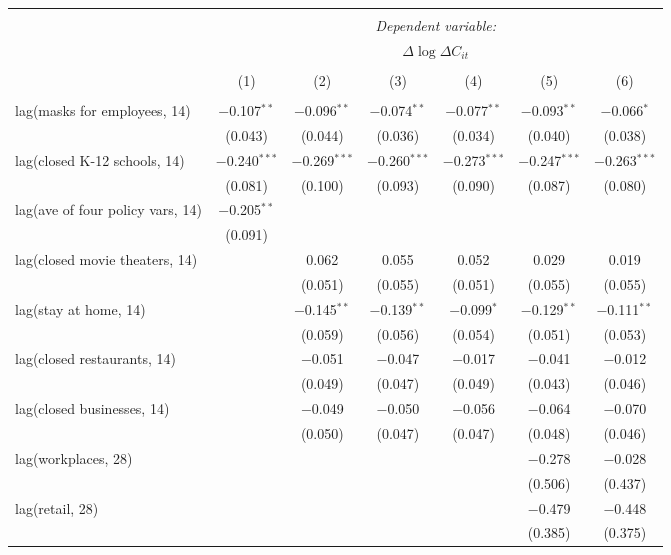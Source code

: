 \begin{tabular}{@{\extracolsep{1pt}}lcccccc} 
\\[-1.8ex]\hline 
\hline \\[-1.8ex] 
 & \multicolumn{6}{c}{\textit{Dependent variable:}} \\ 
\cline{2-7} 
 & \multicolumn{6}{c}{$\Delta \log \Delta C_{it}$} \\ 
\\[-1.8ex] & (1) & (2) & (3) & (4) & (5) & (6)\\ 
\hline \\[-1.8ex] 
 lag(masks for employees, 14) & $-$0.107$^{**}$ & $-$0.096$^{**}$ & $-$0.074$^{**}$ & $-$0.077$^{**}$ & $-$0.093$^{**}$ & $-$0.066$^{*}$ \\ 
  & (0.043) & (0.044) & (0.036) & (0.034) & (0.040) & (0.038) \\ 
  lag(closed K-12 schools, 14) & $-$0.240$^{***}$ & $-$0.269$^{***}$ & $-$0.260$^{***}$ & $-$0.273$^{***}$ & $-$0.247$^{***}$ & $-$0.263$^{***}$ \\ 
  & (0.081) & (0.100) & (0.093) & (0.090) & (0.087) & (0.080) \\ 
  lag(ave of four policy vars, 14) & $-$0.205$^{**}$ &  &  &  &  &  \\ 
  & (0.091) &  &  &  &  &  \\ 
  lag(closed movie theaters, 14) &  & 0.062 & 0.055 & 0.052 & 0.029 & 0.019 \\ 
  &  & (0.051) & (0.055) & (0.051) & (0.055) & (0.055) \\ 
  lag(stay at home, 14) &  & $-$0.145$^{**}$ & $-$0.139$^{**}$ & $-$0.099$^{*}$ & $-$0.129$^{**}$ & $-$0.111$^{**}$ \\ 
  &  & (0.059) & (0.056) & (0.054) & (0.051) & (0.053) \\ 
  lag(closed restaurants, 14) &  & $-$0.051 & $-$0.047 & $-$0.017 & $-$0.041 & $-$0.012 \\ 
  &  & (0.049) & (0.047) & (0.049) & (0.043) & (0.046) \\ 
  lag(closed businesses, 14) &  & $-$0.049 & $-$0.050 & $-$0.056 & $-$0.064 & $-$0.070 \\ 
  &  & (0.050) & (0.047) & (0.047) & (0.048) & (0.046) \\ 
  lag(workplaces, 28) &  &  &  &  & $-$0.278 & $-$0.028 \\ 
  &  &  &  &  & (0.506) & (0.437) \\ 
  lag(retail, 28) &  &  &  &  & $-$0.479 & $-$0.448 \\ 
  &  &  &  &  & (0.385) & (0.375) \\ 

\end{tabular}
